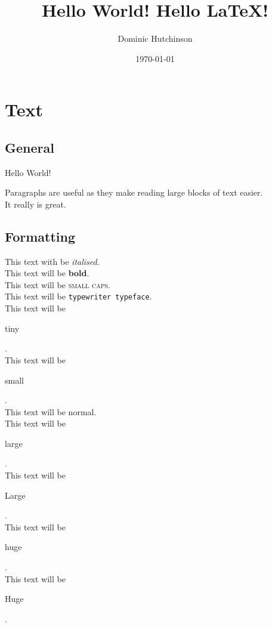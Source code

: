 \documentclass[11pt]{article}
\begin{document}
\title{Hello World! Hello \LaTeX !}
\author{Dominic Hutchinson}
\date{\today} %
\maketitle

\tableofcontents

\newpage

\section{Text}
\subsection{General}
Hello World!\newline

Paragraphs are useful as they make reading large blocks of text easier.\\
It really is great.\newline

\subsection{Formatting}
This text with be \textit{italised}.\\
This text will be \textbf{bold}.\\
This text will be \textsc{small caps}.\\
This text will be \texttt{typewriter typeface}.\\
This text will be \begin{tiny} tiny \end{tiny}.\\
This text will be \begin{small} small \end{small}.\\
This text will be normal.\\
This text will be \begin{large} large \end{large}.\\
This text will be \begin{Large} Large \end{Large}.\\
This text will be \begin{huge} huge \end{huge}.\\
This text will be \begin{Huge} Huge \end{Huge}.\\
\end{document}
